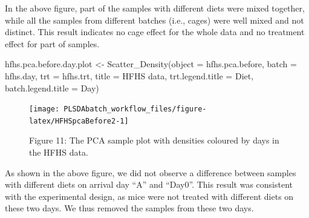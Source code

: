 \documentclass[
]{book}
\newenvironment{Shaded}{\begin{snugshade}}{\end{snugshade}}
\newcommand{\AttributeTok}[1]{\textcolor[rgb]{0.77,0.63,0.00}{#1}}
\newcommand{\FunctionTok}[1]{\textcolor[rgb]{0.00,0.00,0.00}{#1}}
\newcommand{\NormalTok}[1]{#1}
\newcommand{\OtherTok}[1]{\textcolor[rgb]{0.56,0.35,0.01}{#1}}
\newcommand{\StringTok}[1]{\textcolor[rgb]{0.31,0.60,0.02}{#1}}
\begin{document}
In the above figure, part of the samples with different diets were mixed together, while all the samples from different batches (i.e., cages) were well mixed and not distinct. This result indicates no cage effect for the whole data and no treatment effect for part of samples.

\begin{Shaded}
\begin{Highlighting}[]
\NormalTok{hfhs.pca.before.day.plot }\OtherTok{\textless{}{-}} 
  \FunctionTok{Scatter\_Density}\NormalTok{(}\AttributeTok{object =}\NormalTok{ hfhs.pca.before, }
                  \AttributeTok{batch =}\NormalTok{ hfhs.day, }
                  \AttributeTok{trt =}\NormalTok{ hfhs.trt, }
                  \AttributeTok{title =} \StringTok{\textquotesingle{}HFHS data\textquotesingle{}}\NormalTok{, }
                  \AttributeTok{trt.legend.title =} \StringTok{\textquotesingle{}Diet\textquotesingle{}}\NormalTok{,}
                  \AttributeTok{batch.legend.title =} \StringTok{\textquotesingle{}Day\textquotesingle{}}\NormalTok{)}
\end{Highlighting}
\end{Shaded}

\begin{figure}

{\centering \texttt{[image: PLSDAbatch\_workflow\_files/figure-latex/HFHSpcaBefore2-1]} 

}

\caption{Figure 11: The PCA sample plot with densities coloured by days in the HFHS data.}\label{fig:HFHSpcaBefore2}
\end{figure}

As shown in the above figure, we did not observe a difference between samples with different diets on arrival day ``A'' and ``Day0''. This result was consistent with the experimental design, as mice were not treated with different diets on these two days. We thus removed the samples from these two days.
\end{document}
